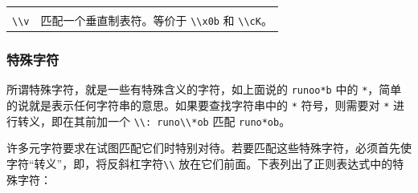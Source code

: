 \documentclass[doctor,openright,twoside]{sjtuthesis}
\newcommand{\passthrough}[1]{#1}
\theoremstyle{plain}
\theoremstyle{definition}
\theoremstyle{remark}
\theoremstyle{ocrenumbox}
\theoremstyle{plain}
\begin{document}
\begin{longtable}[]{@{}cl@{}}
\begin{minipage}[t]{0.72\columnwidth}
\end{minipage}\tabularnewline
\begin{minipage}[t]{0.23\columnwidth}\centering
\passthrough{\lstinline!\\v!}\strut
\end{minipage} & \begin{minipage}[t]{0.72\columnwidth}\raggedright
匹配一个垂直制表符。等价于 \passthrough{\lstinline!\\x0b!} 和 \passthrough{\lstinline!\\cK!}。\strut
\end{minipage}\tabularnewline
\bottomrule
\end{longtable}

\hypertarget{section-87}{%
\subsubsection{特殊字符}\label{section-87}}

所谓特殊字符，就是一些有特殊含义的字符，如上面说的 \passthrough{\lstinline!runoo*b!} 中的 \passthrough{\lstinline!*!}，简单的说就是表示任何字符串的意思。如果要查找字符串中的 \passthrough{\lstinline!*!} 符号，则需要对 \passthrough{\lstinline!*!} 进行转义，即在其前加一个 \passthrough{\lstinline!\\: runo\\*ob!} 匹配 \passthrough{\lstinline!runo*ob!}。

许多元字符要求在试图匹配它们时特别对待。若要匹配这些特殊字符，必须首先使字符``转义''，即，将反斜杠字符\passthrough{\lstinline!\\!} 放在它们前面。下表列出了正则表达式中的特殊字符：
\end{document}
